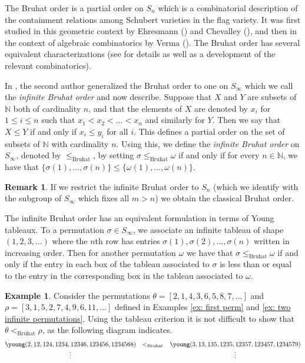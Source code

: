 \documentclass[oneside,11pt,reqno]{amsart}
\newcommand{\nn}{\ensuremath{\mathbb{N}}}
\theoremstyle{definition}
\newtheorem{example}{Example}
\newtheorem{remark}{Remark}
\newtheorem{proof techniques}{Proof Techniques}
\begin{document}
The Bruhat order is a partial order on $S_n$ which is a combinatorial description of the containment relations among Schubert varieties in the flag variety. It was first studied in this geometric context by Ehresmann (\cite{ehresmann1934topologie}) and Chevalley (\cite{chevalley1994decompositions}), and then in the context of algebraic combinatorics by Verma (\cite{verma1966structure}). The Bruhat order has several equivalent characterizations (see \cite{bjorner2005combinatorics} for details as well as a development of the relevant combinatorics). 

In \cite{gallup2021well}, the second author generalized the Bruhat order to one on $S_\infty$ which we call the \emph{infinite Bruhat order} and now describe. Suppose that $X$ and $Y$ are subsets of $\nn$ both of cardinality $n$, and that the elements of $X$ are denoted by $x_i$ for $1 \leq i \leq n$ such that $x_1 < x_2 < \ldots < x_n$ and similarly for $Y$. Then we say that $X \leq Y$ if and only if $x_i \leq y_i$ for all $i$. This defines a partial order on the set of subsets of $\nn$ with cardinality $n$. Using this, we define the \emph{infinite Bruhat order} on $S_\infty$, denoted by $\leq_\text{Bruhat}$, by setting $\sigma \leq_\text{Bruhat} \omega$ if and only if for every $n \in \nn$, we have that $\{ \sigma(1) , \ldots, \sigma(n) \} \leq \{ \omega(1), \ldots, \omega(n) \}$. 

\begin{remark}
    If we restrict the infinite Bruhat order to $S_n$ (which we identify with the subgroup of $S_\infty$ which fixes all $m > n$) we obtain the classical Bruhat order.
\end{remark} 

The infinite Bruhat order has an equivalent formulation in terms of Young tableaux. To a permutation $\sigma \in S_\infty$, we associate an infinite tableau of shape $(1 , 2 , 3 , \ldots )$ where the $n$th row has entries $\sigma(1) , \sigma(2) , \ldots, \sigma(n)$ written in increasing order. 
Then for another permutation $\omega$ we have that $\sigma \leq_\text{Bruhat} \omega$ if and only if the entry in each box of the tableau associated to $\sigma$ is less than or equal to the entry in the corresponding box in the tableau associated to $\omega$.

\begin{example}
Consider the permutations $\theta = [2,1,4,3,6,5,8,7, \ldots]$ and  $\rho = [3, 1, 5, 2, 7, 4, 9, 6, 11 , \ldots ]$ defined in Examples \ref{ex: first perm} and \ref{ex: two infinite permutations}. Using the tableau criterion it is not difficult to show that $\theta <_\text{Bruhat} \rho$, as the following diagram indicates. 
\begin{align*}
\begin{matrix}
    \young(2,12,124,1234,12346,123456,1234568) & <_\text{Bruhat} &\young(3,13,135,1235,12357,123457,1234579)
\\ \vdots & &  \vdots
\end{matrix}
\end{align*}
\end{example}
\end{document}
